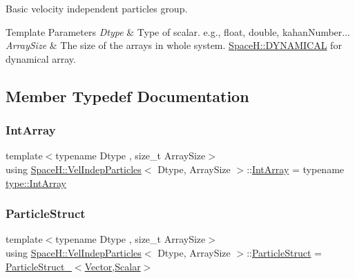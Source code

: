 Basic velocity independent particles group. 


\begin{DoxyTemplParams}{Template Parameters}
{\em Dtype} & Type of scalar. e.\+g., float, double, kahan\+Number... \\
\hline
{\em Array\+Size} & The size of the arrays in whole system. \mbox{\hyperlink{namespace_space_h_a3e55b9bc2a9e10c08ce8121bce11244a}{Space\+H\+::\+D\+Y\+N\+A\+M\+I\+C\+AL}} for dynamical array. \\
\hline
\end{DoxyTemplParams}


\subsection{Member Typedef Documentation}
\mbox{\label{class_space_h_1_1_vel_indep_particles_abe09426d740c8c2425c5fc3789c9c744}} 
\subsubsection{\texorpdfstring{Int\+Array}{IntArray}}
{\footnotesize\ttfamily template$<$typename Dtype , size\+\_\+t Array\+Size$>$ \\
using \mbox{\hyperlink{class_space_h_1_1_vel_indep_particles}{Space\+H\+::\+Vel\+Indep\+Particles}}$<$ Dtype, Array\+Size $>$\+::\mbox{\hyperlink{class_space_h_1_1_vel_indep_particles_abe09426d740c8c2425c5fc3789c9c744}{Int\+Array}} =  typename \mbox{\hyperlink{struct_space_h_1_1_proto_type_ad9105b93d029a9d231bc31ddcfd7dbd9}{type\+::\+Int\+Array}}}

\mbox{\label{class_space_h_1_1_vel_indep_particles_ab20a7efcdf5e90bd1d073eb73be59120}} 
\subsubsection{\texorpdfstring{Particle\+Struct}{ParticleStruct}}
{\footnotesize\ttfamily template$<$typename Dtype , size\+\_\+t Array\+Size$>$ \\
using \mbox{\hyperlink{class_space_h_1_1_vel_indep_particles}{Space\+H\+::\+Vel\+Indep\+Particles}}$<$ Dtype, Array\+Size $>$\+::\mbox{\hyperlink{class_space_h_1_1_vel_indep_particles_ab20a7efcdf5e90bd1d073eb73be59120}{Particle\+Struct}} =  \mbox{\hyperlink{struct_space_h_1_1_particle_struct__}{Particle\+Struct\+\_\+}}$<$\mbox{\hyperlink{class_space_h_1_1_vel_indep_particles_a61bbcfdb0dc7f99f3c68af69a755c935}{Vector}},\mbox{\hyperlink{class_space_h_1_1_vel_indep_particles_aeb47d8131b30ed790320ff634f0d6af1}{Scalar}}$>$}

